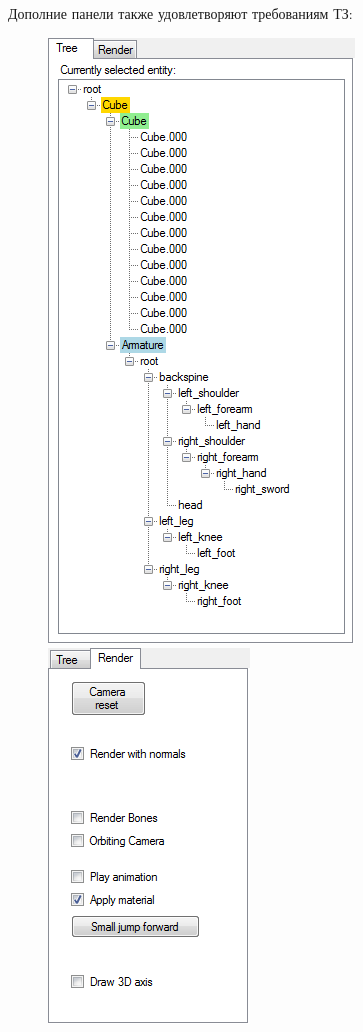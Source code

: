 Дополние панели также удовлетворяют требованиям ТЗ:
\begin{figure}
\centering
\begin{minipage}{.4\textwidth}
  \centering
  \includegraphics[height=.2\textheight]{../screenshots/tree_view_panel.png}
\end{minipage}%
\begin{minipage}{.4\textwidth}
  \centering
  \includegraphics[height=.2\textheight]{../screenshots/render_panel.png}
\end{minipage}
\end{figure}

